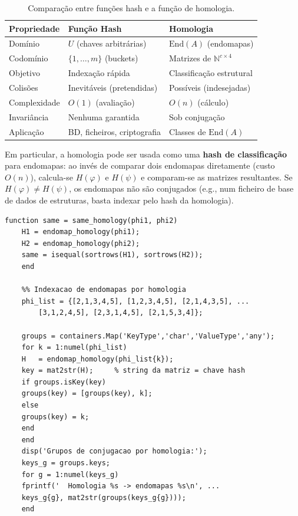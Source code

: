 \begin{table}[htbp]
	\centering
	\caption{Comparação entre funções hash e a função de homologia.}
	\begin{tabular}{lll}
		\toprule
		\textbf{Propriedade} & \textbf{Função Hash} & \textbf{Homologia} \\
		\midrule
		Domínio        & $U$ (chaves arbitrárias)         & $\mathrm{End}(A)$ (endomapas) \\
		Codomínio      & $\{1,\ldots,m\}$ (buckets)       & Matrizes de $\mathbb{N}^{c\times 4}$ \\
		Objetivo       & Indexação rápida                  & Classificação estrutural \\
		Colisões       & Inevitáveis (pretendidas)         & Possíveis (indesejadas) \\
		Complexidade   & $O(1)$ (avaliação)               & $O(n)$ (cálculo) \\
		Invariância    & Nenhuma garantida                 & Sob conjugação \\
		Aplicação      & BD, ficheiros, criptografia       & Classes de $\mathrm{End}(A)$ \\
		\bottomrule
	\end{tabular}
	\label{tab:hash_vs_hom}
\end{table}

Em particular, a homologia pode ser usada como uma
\textbf{hash de classificação} para endomapas: ao invés de
comparar dois endomapas diretamente (custo $O(n)$), calcula-se
$H(\varphi)$ e $H(\psi)$ e comparam-se as matrizes resultantes.
Se $H(\varphi) \neq H(\psi)$, os endomapas não são conjugados
(e.g., num ficheiro de base de dados de estruturas, basta
indexar pelo hash da homologia).

\begin{lstlisting}[style=matlab, caption={Uso da homologia como hash de classificação de endomapas}]
	function same = same_homology(phi1, phi2)
	H1 = endomap_homology(phi1);
	H2 = endomap_homology(phi2);
	same = isequal(sortrows(H1), sortrows(H2));
	end
	
	%% Indexacao de endomapas por homologia
	phi_list = {[2,1,3,4,5], [1,2,3,4,5], [2,1,4,3,5], ...
		[3,1,2,4,5], [2,3,1,4,5], [2,1,5,3,4]};
	
	groups = containers.Map('KeyType','char','ValueType','any');
	for k = 1:numel(phi_list)
	H   = endomap_homology(phi_list{k});
	key = mat2str(H);     % string da matriz = chave hash
	if groups.isKey(key)
	groups(key) = [groups(key), k];
	else
	groups(key) = k;
	end
	end
	disp('Grupos de conjugacao por homologia:');
	keys_g = groups.keys;
	for g = 1:numel(keys_g)
	fprintf('  Homologia %s -> endomapas %s\n', ...
	keys_g{g}, mat2str(groups(keys_g{g})));
	end
\end{lstlisting}

